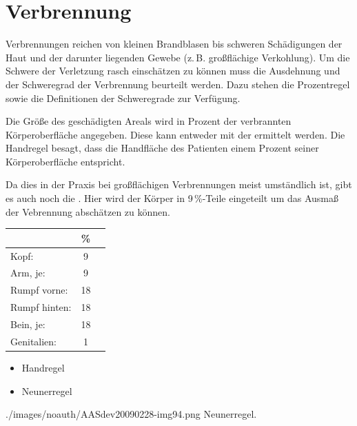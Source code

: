 
\section{Verbrennung}
\label{topic:verbrennung}


Verbrennungen reichen von kleinen Brandblasen bis schweren Schädigungen der Haut
und der darunter liegenden Gewebe (z.\,B. großflächige Verkohlung). Um die Schwere
der Verletzung rasch einschätzen zu können muss die Ausdehnung und der
Schweregrad der Verbrennung beurteilt werden. Dazu stehen die Prozentregel sowie
die Definitionen der Schweregrade zur Verfügung.




{%
Die Größe des geschädigten Areals wird in Prozent der
ver\-brannten Körperoberfläche angegeben. Diese kann entweder mit der
  ermittelt werden. Die Handregel besagt, dass die Handfläche
des Patienten einem Prozent seiner Körperoberfläche entspricht. 

Da dies in der Praxis bei großflächigen Verbrennungen meist umständlich ist, gibt
es auch noch die . Hier wird der Körper in
9\,\%-Teile eingeteilt um das Ausmaß der Vebrennung abschätzen zu können.

\begin{center}
\begin{tabulary}{\linewidth}[H]{LCC}
\toprule
 & \% &
\\\midrule
Kopf:
 & 9  &
\\
Arm, je:  &  9  &
\\
Rumpf vorne: & 18  &
\\
Rumpf hinten: & 18 &
\\
Bein, je: & 18 &
\\
Genitalien:  & 1 &
\\\bottomrule
\end{tabulary}
\end{center}

}
{\begin{itemize}
    \item Handregel
    \item Neunerregel
\end{itemize}}
{./images/noauth/AASdev20090228-img94.png}
{Neunerregel.\label{tab:Neunerregel}}{}

